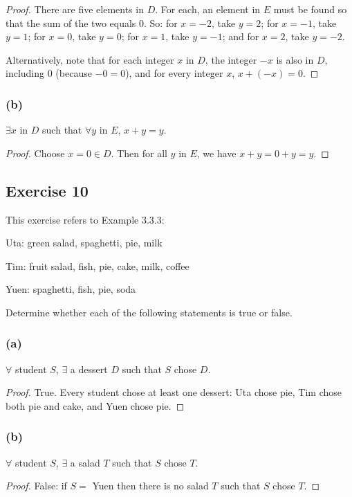 \documentclass[14pt]{extarticle}
\newcommand{\fa}{\forall}
\newcommand{\te}{\exists}
\begin{document}
\begin{proof}
    There are five elements in $D$. For each, an element in $E$ must be found so that the sum of the two equals 0. So: for $x = -2$, take $y = 2$; for $x = -1$, take $y = 1$; for $x = 0$, take $y = 0$; for $x = 1$, take $y = -1$; and for $x = 2$, take $y = -2$.

    Alternatively, note that for each integer $x$ in $D$, the integer $-x$ is also in $D$, including $0$ (because $-0 = 0$), and for every integer $x$, $x + (-x) = 0$.
\end{proof}

\subsubsection{(b)}
$\te x$ in $D$ such that $\fa y$ in $E$, $x + y = y$.

\begin{proof}
    Choose $x = 0 \in D$. Then for all $y$ in $E$, we have $x + y = 0 + y = y$.
\end{proof}

\subsection{Exercise 10}
This exercise refers to Example 3.3.3:

Uta: green salad, spaghetti, pie, milk

Tim: fruit salad, fish, pie, cake, milk, coffee

Yuen: spaghetti, fish, pie, soda

Determine whether each of the following statements is true or false.

\subsubsection{(a)}
$\fa$ student $S$, $\te$ a dessert $D$ such that $S$ chose $D$.

\begin{proof}
    True. Every student chose at least one dessert: Uta chose pie, Tim chose both pie and cake, and Yuen chose pie.
\end{proof}

\subsubsection{(b)}
$\fa$ student $S$, $\te$ a salad $T$ such that $S$ chose $T$.

\begin{proof}
    False: if $S = $ Yuen then there is no salad $T$ such that $S$ chose $T$.
\end{proof}
\end{document}
